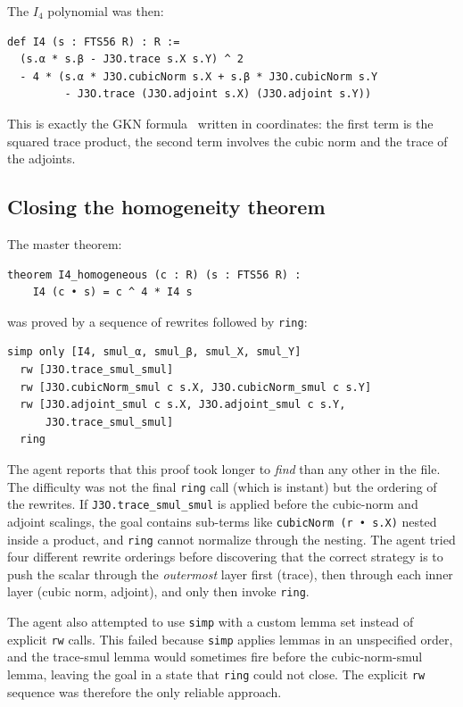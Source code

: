 \documentclass[11pt]{article}
\theoremstyle{definition}
\newcommand{\Iq}{I_4}
\begin{document}
The $\Iq$ polynomial was then:

\begin{lstlisting}[language=leanL]
def I4 (s : FTS56 R) : R :=
  (s.α * s.β - J3O.trace s.X s.Y) ^ 2
  - 4 * (s.α * J3O.cubicNorm s.X + s.β * J3O.cubicNorm s.Y
         - J3O.trace (J3O.adjoint s.X) (J3O.adjoint s.Y))
\end{lstlisting}

This is exactly the GKN formula~\cite{gkn2001} written in coordinates:
the first term is the squared trace product, the second term involves
the cubic norm and the trace of the adjoints.

\subsection{Closing the homogeneity theorem}
\label{sec:agent-hom}

The master theorem:

\begin{lstlisting}[language=leanL]
theorem I4_homogeneous (c : R) (s : FTS56 R) :
    I4 (c • s) = c ^ 4 * I4 s
\end{lstlisting}

was proved by a sequence of rewrites followed by \texttt{ring}:

\begin{lstlisting}[language=leanL]
  simp only [I4, smul_α, smul_β, smul_X, smul_Y]
  rw [J3O.trace_smul_smul]
  rw [J3O.cubicNorm_smul c s.X, J3O.cubicNorm_smul c s.Y]
  rw [J3O.adjoint_smul c s.X, J3O.adjoint_smul c s.Y,
      J3O.trace_smul_smul]
  ring
\end{lstlisting}

The agent reports that this proof took longer to \emph{find} than any
other in the file. The difficulty was not the final \texttt{ring} call
(which is instant) but the ordering of the rewrites. If
\texttt{J3O.trace\_smul\_smul} is applied before the cubic-norm and
adjoint scalings, the goal contains sub-terms like
\texttt{cubicNorm (r • s.X)} nested inside a product, and \texttt{ring}
cannot normalize through the nesting. The agent tried four different
rewrite orderings before discovering that the correct strategy is to
push the scalar through the \emph{outermost} layer first (trace), then
through each inner layer (cubic norm, adjoint), and only then invoke
\texttt{ring}.

The agent also attempted to use \texttt{simp} with a custom lemma set
instead of explicit \texttt{rw} calls. This failed because \texttt{simp}
applies lemmas in an unspecified order, and the trace-smul lemma would
sometimes fire before the cubic-norm-smul lemma, leaving the goal in a
state that \texttt{ring} could not close. The explicit \texttt{rw}
sequence was therefore the only reliable approach.
\end{document}
